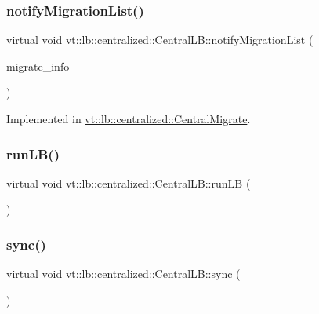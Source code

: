 \subsubsection{\texorpdfstring{notify\+Migration\+List()}{notifyMigrationList()}}
{\footnotesize\ttfamily virtual void vt\+::lb\+::centralized\+::\+Central\+L\+B\+::notify\+Migration\+List (\begin{DoxyParamCaption}\item[{\hyperlink{structvt_1_1lb_1_1centralized_1_1_central_l_b_a8d393c0126180fb8cce2b881c23df44f}{Migrate\+Info\+Type} const \&}]{migrate\+\_\+info }\end{DoxyParamCaption})\hspace{0.3cm}{\ttfamily [pure virtual]}}



Implemented in \hyperlink{structvt_1_1lb_1_1centralized_1_1_central_migrate_a53c5eb03e2f6af93f207093683bbbd17}{vt\+::lb\+::centralized\+::\+Central\+Migrate}.

\mbox{\label{structvt_1_1lb_1_1centralized_1_1_central_l_b_a758e6e57f66a6ad143cef6156294c98d}} 
\subsubsection{\texorpdfstring{run\+L\+B()}{runLB()}}
{\footnotesize\ttfamily virtual void vt\+::lb\+::centralized\+::\+Central\+L\+B\+::run\+LB (\begin{DoxyParamCaption}{ }\end{DoxyParamCaption})\hspace{0.3cm}{\ttfamily [pure virtual]}}

\mbox{\label{structvt_1_1lb_1_1centralized_1_1_central_l_b_a387d927741a5365094b21c988933e171}} 
\subsubsection{\texorpdfstring{sync()}{sync()}}
{\footnotesize\ttfamily virtual void vt\+::lb\+::centralized\+::\+Central\+L\+B\+::sync (\begin{DoxyParamCaption}{ }\end{DoxyParamCaption})\hspace{0.3cm}{\ttfamily [pure virtual]}}



